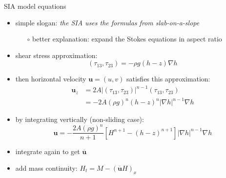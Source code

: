 \begin{frame}{SIA model equations}

\begin{itemize}
\item simple slogan: \emph{the SIA uses the formulas from slab-on-a-slope}
  \begin{itemize}
  \item[$\circ$] better explanation: expand the Stokes equations in aspect ratio
  \end{itemize}

\item shear stress approximation:
	$$(\tau_{13},\tau_{23}) = - \rho g (h-z) \nabla h$$
\item then horizontal velocity $\mathbf{u} = (u,v)$ satisfies this approximation:
\begin{align*}
\mathbf{u}_z &= 2 A |(\tau_{13},\tau_{23})|^{n-1} (\tau_{13},\tau_{23}) \\
     &= - 2 A (\rho g)^n (h-z)^n |\nabla h|^{n-1} \nabla h
\end{align*}
\item by integrating vertically (non-sliding case):
    $$\mathbf{u} = - \frac{2 A (\rho g)^n}{n+1} \left[H^{n+1} - (h-z)^{n+1}\right] |\nabla h|^{n-1} \nabla h$$
\item integrate again to get $\overline{\mathbf{u}}$
\item add mass continuity: \quad $H_t = M - \left(\overline{\mathbf{u}} H\right)_x$
\end{itemize}
\end{frame}


